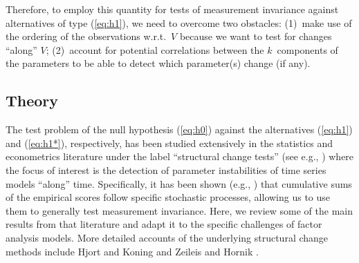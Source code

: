 \documentclass[man]{apa}
\begin{document}
Therefore, to employ this quantity for tests of measurement invariance against alternatives
of type (\ref{eq:h1}), we need to overcome two obstacles: (1)~make use of the ordering of
the observations w.r.t.\ $V$ because we want to test for changes ``along'' $V$; (2)~account
for potential correlations between the $k$~components of the parameters to be able to detect
which parameter(s) change (if any).

\subsection{Theory}

The test problem of the null hypothesis (\ref{eq:h0}) against the alternatives
(\ref{eq:h1}) and (\ref{eq:h1*}), respectively, has been studied extensively
in the statistics and econometrics literature under the label ``structural change
tests'' (see e.g., ) where the focus of interest is the
detection of parameter instabilities of time series models ``along'' time.
Specifically, it has been shown (e.g., )
that cumulative sums of the empirical scores follow specific stochastic processes, allowing
us to use them to generally test measurement invariance. Here, we review
some of the main results from that literature and adapt it to the specific challenges
of factor analysis models. More detailed accounts of the underlying structural
change methods include Hjort and Koning \citeyear{HjoKon02} and
Zeileis and Hornik \citeyear{ZeiHor07}.
\end{document}
